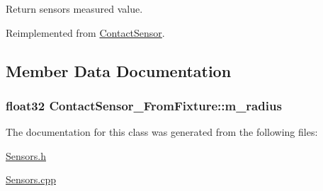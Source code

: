Return sensors measured value. 



Reimplemented from \hyperlink{classContactSensor_af616ebea2da4d9fd0dacdf71eb8b32d9}{Contact\-Sensor}.



\subsection{Member Data Documentation}
\hypertarget{classContactSensor__FromFixture_a059bda2fabb5680ff425af83274feb22}{
\subsubsection[{m\-\_\-radius}]{\setlength{\rightskip}{0pt plus 5cm}float32 Contact\-Sensor\-\_\-\-From\-Fixture\-::m\-\_\-radius}}\label{classContactSensor__FromFixture_a059bda2fabb5680ff425af83274feb22}


The documentation for this class was generated from the following files\-:\begin{DoxyCompactItemize}
\item 
\hyperlink{Sensors_8h}{Sensors.\-h}\item 
\hyperlink{Sensors_8cpp}{Sensors.\-cpp}\end{DoxyCompactItemize}
